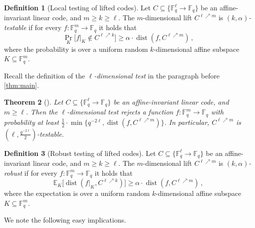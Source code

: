 \documentclass[11pt]{article}
\numberwithin{equation}{section}
\newtheorem{theorem}{Theorem}[section]
\newtheorem{proposition}[theorem]{Proposition}
\theoremstyle{definition}
\newtheorem{definition}[theorem]{Definition}
\theoremstyle{plain}
\theoremstyle{plain}
\DeclareMathOperator{\dist}{dist} %
\newcommand{\E}{{\mathbb{E}}}
\newcommand{\F}{{\mathbb{F}}}
\newcommand{\Func}[1]{\{\F_q^{#1} \to \F_q\}}
\begin{document}
\begin{definition}[Local testing of lifted codes]
Let $C \subseteq \Func{\ell}$ be an affine-invariant linear  code, and $m\geq k \geq \ell$. The $m$-dimensional lift $C^{\ell \nearrow m}$ is \emph{$(k,\alpha)$-testable} if for every $f: \F_q^m \to \F_q$ it holds that
\[\Pr_K\big[f|_K \notin C^{\ell \nearrow k}\big] \geq \alpha \cdot \dist(f, C^{\ell \nearrow m})\,,\]
where the probability is over a uniform random $k$-dimensional affine subspace $K \subseteq \F_q^m$.
\end{definition}

%
%
Recall the definition of the \emph{$\ell$-dimensional test}
in the paragraph before \cref{thm:main}.   %

\begin{theorem}[{\cite[Theorem 2.9]{KaufmanS2008}}]\label{lifted-testing}
  Let $C \subseteq\{\F_{q}^{\ell}\to\F_{q}\}$ be an affine-invariant linear  code, and $m \geq \ell$. Then the $\ell$-dimensional test
rejects a function $f: \F_q^m \to \F_q$ with probability at least $ \frac 1 2 \cdot \min \big \{ q^{-2\ell},  \dist(f, C^{\ell \nearrow m})\big\}$. In particular, $C^{\ell \nearrow m}$ is $\left(\ell,\frac  {q^{-2\ell}} {2}\right)$-testable.
\end{theorem}

\begin{definition}[Robust testing of lifted codes]
Let $C \subseteq \Func{\ell}$ be an affine-invariant linear  code, and $m\geq k \geq \ell$.  The $m$-dimensional lift $C^{\ell \nearrow m}$ is \emph{ $(k,\alpha)$-robust} if for every $f: \F_q^m \to \F_q$ it holds that
\[\E_K\big[\dist(f|_K, C^{\ell \nearrow k})\big] \geq \alpha \cdot \dist(f, C^{\ell \nearrow m})\,,\]
where the expectation is over a uniform random $k$-dimensional affine subspace $K \subseteq \F_q^m$.
\end{definition}

We note the following easy implications.
\end{document}
